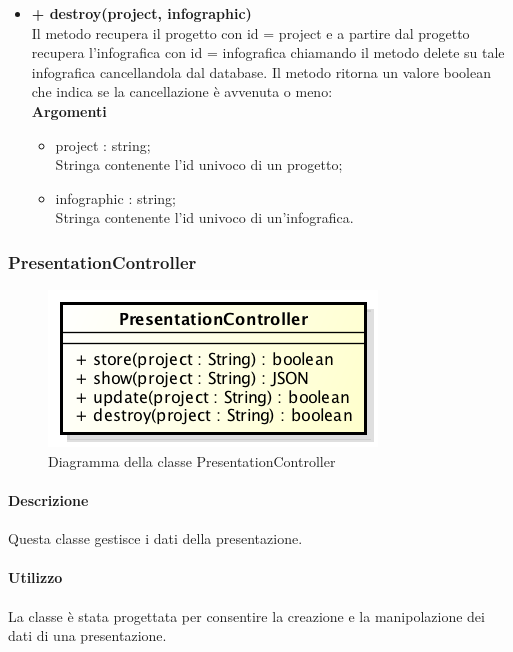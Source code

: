 \begin{itemize}
\begin{itemize}
			\end{itemize}
			\item \textbf{+ destroy(project, infographic)}\\
			Il metodo recupera il progetto con id = project e a partire dal progetto recupera l'infografica con id = infografica chiamando il metodo delete su tale infografica cancellandola dal database. Il metodo ritorna un valore boolean che indica se la cancellazione è avvenuta o meno:\\
			\textbf{Argomenti}
			\begin{itemize}
				\item project : string; \\
				Stringa contenente l'id univoco di un progetto;
				\item infographic : string; \\
				Stringa contenente l'id univoco di un'infografica.
			\end{itemize}
		\end{itemize}
		
\newpage
\subsubsection{PresentationController}
\begin{figure}[h]
\centering
\includegraphics[width=0.5\linewidth]{img/back_end_premi_http_controllers_presentationController}
\caption[Diagramma della classe PresentationController]{Diagramma della classe PresentationController}
\label{fig:back_end_premi_http_controllers_presentationController}
\end{figure}


	\paragraph{Descrizione}
		Questa classe gestisce i dati della presentazione.
	\paragraph{Utilizzo}
		La classe è stata progettata per consentire la creazione e la manipolazione dei dati di una presentazione.
	
